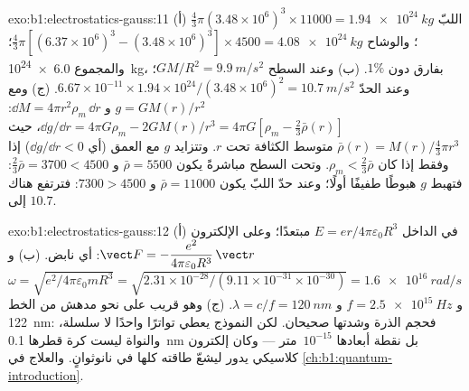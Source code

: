 \begin{solution}{exo:b1:electrostatics-gauss:11}
(أ) اللبّ $\tfrac43\pi(3.48 \times 10^6)^3 \times 11000 = \qty{1.94e24}{kg}$؛ والوشاح
$\tfrac43\pi[(6.37 \times 10^6)^3 - (3.48 \times 10^6)^3] \times 4500 = \qty{4.08e24}{kg}$؛
والمجموع \qty{6.0e24}{kg}، بفارق دون $1\%$. (ب) وعند السطح $GM/R^2 = \qty{9.9}{m/s^2}$؛
وعند الحدّ $6.67 \times 10^{-11} \times 1.94 \times 10^{24}/(3.48 \times 10^6)^2 =
\qty{10.7}{m/s^2}$. (ج) ومع $g = GM(r)/r^2$ و $\dd M = 4\pi r^2\rho_m\,\dd r$:
$\dd g/\dd r = 4\pi G\rho_m - 2GM(r)/r^3 = 4\pi G[\rho_m - \tfrac23\bar\rho(r)]$،
حيث $\bar\rho(r) = M(r)/\tfrac43\pi r^3$ متوسط الكثافة تحت $r$.
وتتزايد $g$ مع العمق (أي $\dd g/\dd r < 0$) إذا وفقط إذا كان $\rho_m < \tfrac23\bar\rho$. وتحت
السطح مباشرةً يكون $\bar\rho = 5500$ و $\tfrac23\bar\rho = 3700 < 4500$: فتهبط $g$
هبوطًا طفيفًا أولًا؛ وعند حدّ اللبّ يكون $\bar\rho = 11000$ و $7300 >
4500$: فترتفع هناك إلى $10.7$.
\end{solution}

\begin{solution}{exo:b1:electrostatics-gauss:12}
(أ) في الداخل $E = er/4\pi\varepsilon_0R^3$ مبتعدًا؛ وعلى الإلكترون $\vect F =
-\dfrac{e^2}{4\pi\varepsilon_0R^3}\,\vect r$: أي نابض. (ب) و $\omega = \sqrt{e^2/4\pi\varepsilon_0mR^3}
= \sqrt{2.31 \times 10^{-28}/(9.11 \times 10^{-31} \times 10^{-30})} = \qty{1.6e16}{rad/s}$
و $f = \qty{2.5e15}{Hz}$ و $\lambda = c/f = \qty{120}{nm}$. (ج) وهو قريب على نحو مدهش
من الخط \qty{122}{nm}: فحجم الذرة وشدتها صحيحان.
لكن النموذج يعطي تواترًا واحدًا لا سلسلة، والنواة ليست
كرة قطرها \qty{0.1}{nm} بل نقطة أبعادها $10^{-15}$~متر --- وكان إلكترون كلاسيكي
يدور ليشعّ طاقته كلها في نانوثوانٍ. والعلاج
في \cref{ch:b1:quantum-introduction}.
\end{solution}


